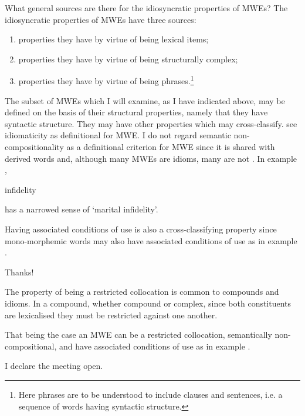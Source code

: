 \documentclass[output=paper]{langsci/langscibook}
\begin{document}
What general sources are there for the idiosyncratic properties of MWEs? The idiosyncratic properties of MWEs have three sources:

\begin{enumerate}
\item properties they have by virtue of being lexical items;
\item properties they have by virtue of being structurally complex;
\item properties they have by virtue of being phrases.\footnote{   Here phrases are to be understood to include clauses and sentences, i.e. a sequence of words having syntactic structure.}
\end{enumerate}

The subset of MWEs which %
I will examine, as %
I have indicated above, may be defined on the basis of their structural properties, namely that 
they have syntactic structure. They may have other properties which may cross-classify. 
\citet{Sag:2002} see idiomaticity as definitional for MWE. %
I do not regard semantic non-compositionality as a definitional criterion for MWE since it is shared with derived words 
\citep{Jackendoff2002} and, although many MWEs are idioms, many are not \citep{Melcuk2012}.  In 
example ,

\begin{exe}
\ex\label{ex:ex02}	infidelity
\end{exe}

\noindent
has a narrowed sense of ‘marital infidelity’. 

Having associated conditions of use is also a cross-classifying property since mono-morphemic words may also have associated conditions of use as in example .

\begin{exe}
\ex\label{ex:ex03}	Thanks!
\end{exe}

The property of being a restricted collocation is common to compounds and idioms. In a compound, whether compound or complex, since both constituents are lexicalised they must be restricted against one another. 

That being the case an MWE can be a restricted collocation, semantically non-compositional, and have associated conditions of use as in example .

\begin{exe}
\ex\label{ex:ex04} I declare the meeting open.
\end{exe}
\end{document}

